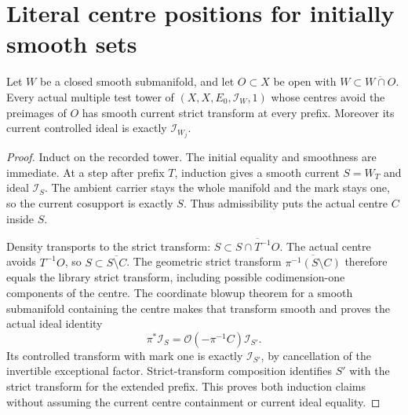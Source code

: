 \section{Literal centre positions for initially smooth sets}

\begin{lemma}
\label{hir:smooth-current-ideal-along-tower}
\leanok
Let $W$ be a closed smooth submanifold, and let $O\subset X$ be open with
$W\subset\overline{W\cap O}$. Every actual multiple test tower of
$(X,X,E_0,\mathcal I_W,1)$ whose centres avoid the preimages of $O$ has
smooth current strict transform at every prefix. Moreover its current
controlled ideal is exactly $\mathcal I_{W_j}$.
\end{lemma}
\begin{proof}
Induct on the recorded tower. The initial equality and smoothness are
immediate. At a step after prefix $T$, induction gives a smooth current
$S=W_T$ and ideal $\mathcal I_S$. The ambient carrier stays the whole
manifold and the mark stays one, so the current cosupport is exactly $S$.
Thus admissibility puts the actual centre $C$ inside $S$.

Density transports to the strict transform:
$S\subset\overline{S\cap T^{-1}O}$. The actual centre avoids $T^{-1}O$,
so $S\subset\overline{S\setminus C}$. The geometric strict transform
$\overline{\pi^{-1}(S\setminus C)}$ therefore equals the library strict
transform, including possible codimension-one components of the centre.
The coordinate blowup theorem for a smooth submanifold containing the
centre makes that transform smooth and proves the actual ideal identity
\[
 \pi^*\mathcal I_S=\mathcal O(-\pi^{-1}C)\mathcal I_{S'}.
\]
Its controlled transform with mark one is exactly $\mathcal I_{S'}$,
by cancellation of the invertible exceptional factor. Strict-transform
composition identifies $S'$ with the strict transform for the extended
prefix. This proves both induction claims without assuming the current
centre containment or current ideal equality.
\end{proof}

